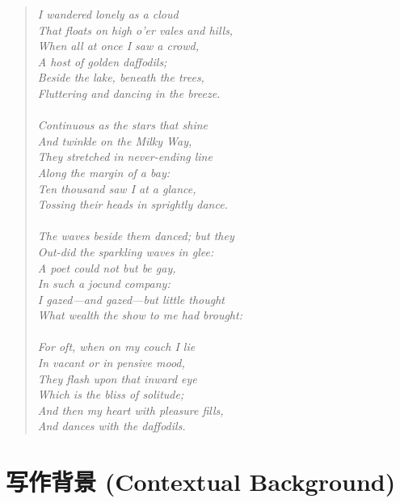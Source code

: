 \documentclass[12pt, a4paper]{article}
\begin{document}
\begin{quote}
\linespread{1.1} %
\textit{
I wandered lonely as a cloud \\
That floats on high o'er vales and hills, \\
When all at once I saw a crowd, \\
A host of golden daffodils; \\
Beside the lake, beneath the trees, \\
Fluttering and dancing in the breeze. \\
\\
Continuous as the stars that shine \\
And twinkle on the Milky Way, \\
They stretched in never-ending line \\
Along the margin of a bay: \\
Ten thousand saw I at a glance, \\
Tossing their heads in sprightly dance. \\
\\
The waves beside them danced; but they \\
Out-did the sparkling waves in glee: \\
A poet could not but be gay, \\
In such a jocund company: \\
I gazed—and gazed—but little thought \\
What wealth the show to me had brought: \\
\\
For oft, when on my couch I lie \\
In vacant or in pensive mood, \\
They flash upon that inward eye \\
Which is the bliss of solitude; \\
And then my heart with pleasure fills, \\
And dances with the daffodils.
}
\end{quote}
\linespread{1.3} %

\section{写作背景 (Contextual Background)}
\end{document}
